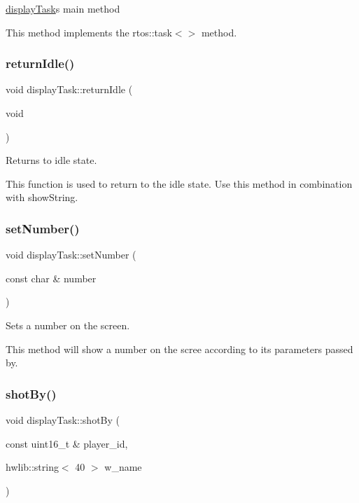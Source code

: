 \mbox{\hyperlink{classdisplay_task}{display\+Task}}\textquotesingle{}s main method 

This method implements the rtos\+::task$<$$>$ method. \mbox{\label{classdisplay_task_a67990960198f75d5a9815dc4e5a9e375}} 
\subsubsection{\texorpdfstring{return\+Idle()}{returnIdle()}}
{\footnotesize\ttfamily void display\+Task\+::return\+Idle (\begin{DoxyParamCaption}\item[{void}]{ }\end{DoxyParamCaption})}



Returns to idle state. 

This function is used to return to the idle state. Use this method in combination with show\+String. \mbox{\label{classdisplay_task_ae47b5facd84033ed17a473e40d67e838}} 
\subsubsection{\texorpdfstring{set\+Number()}{setNumber()}}
{\footnotesize\ttfamily void display\+Task\+::set\+Number (\begin{DoxyParamCaption}\item[{const char \&}]{number }\end{DoxyParamCaption})}



Sets a number on the screen. 

This method will show a number on the scree according to its parameters passed by. \mbox{\label{classdisplay_task_ab9aebca5a9d98bfb5c7fafe5b25ed2c4}} 
\subsubsection{\texorpdfstring{shot\+By()}{shotBy()}}
{\footnotesize\ttfamily void display\+Task\+::shot\+By (\begin{DoxyParamCaption}\item[{const uint16\+\_\+t \&}]{player\+\_\+id,  }\item[{hwlib\+::string$<$ 40 $>$}]{w\+\_\+name }\end{DoxyParamCaption})}



